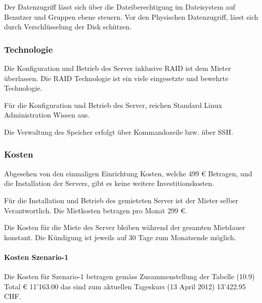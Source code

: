 Der Datenzugriff lässt sich über die Dateiberechtigung im Dateisystem auf Benutzer und Gruppen ebene steuern. Vor den Physischen Datenzugriff, lässt sich durch Verschlüsselung der Disk schützen.

\subsubsection{Technologie}
Die Konfiguration und Betrieb des Server inklusive RAID ist dem Mieter überlassen. Die RAID Technologie ist ein viele eingesetzte und bewehrte Technologie.

Für die Konfiguration und Betrieb des Server, reichen Standard Linux Administration Wissen aus.

Die Verwaltung des Speicher erfolgt über Kommandozeile bzw. über \gls{SSH}.

\subsubsection{Kosten}
Abgesehen von den einmaligen Einrichtung Kosten, welche 499 € Betragen, und die Installation der Servers, gibt es keine weitere Investitionskosten. 

Für die Installation und Betrieb des gemieteten Server ist der Mieter selber Verantwortlich. Die Mietkosten betragen pro Monat 299 €.

Die Kosten für die Miete des Server bleiben während der gesamten Mietdauer konstant. Die Kündigung ist jeweils auf 30 Tage zum Monatsende möglich. 

\paragraph*{Kosten Szenario-1}
Die Kosten für Szenario-1 betragen gemäss Zusammenstellung der Tabelle (10.9) Total € 11'163.00 das sind zum aktuellen Tageskurs (13 April 2012) 13'422.95 CHF.

